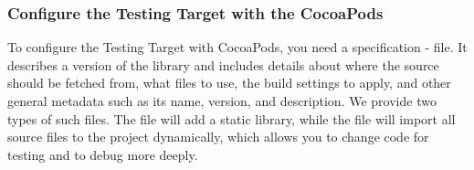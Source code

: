 \subsubsection{Configure the Testing Target with the CocoaPods}



To configure the Testing Target with CocoaPods, you need a specification -  file. It describes a version of the  library and includes 
details about where the source should be fetched from, what files to use, the build settings to apply, 
and other general metadata such as its name, version, and description. 
We provide two types of such files. The  file will add a static library, while the  file will import 
all source files to the project dynamically, which allows you to  change code for testing and to debug more deeply. 
